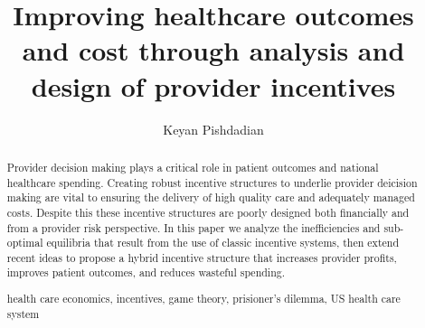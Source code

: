 \documentclass[a4paper]{llncs}
\newcommand{\keywords}[1]{\par\addvspace\baselineskip
\noindent\keywordname\enspace\ignorespaces#1}
\begin{document}
\mainmatter  %

\title{Improving healthcare outcomes and cost through analysis and design of provider incentives}


%
%
\author{Keyan Pishdadian}
%


%
%

\maketitle


\begin{abstract}
Provider decision making plays a critical role in patient outcomes and national healthcare spending. Creating robust incentive structures to underlie provider deicision making are vital to ensuring the delivery of high quality care and adequately managed costs. Despite this these incentive structures are poorly designed both financially and from a provider risk perspective. In this paper we analyze the inefficiencies and sub-optimal equilibria that result from the use of classic incentive systems, then extend recent ideas to propose a hybrid incentive structure that increases provider profits, improves patient outcomes, and reduces wasteful spending.

\keywords{health care economics, incentives, game theory, prisioner's dilemma, US health care system}
\end{abstract}
\end{document}
